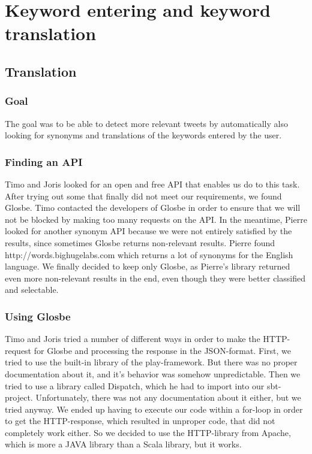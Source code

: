 \section{Keyword entering and keyword translation }
\subsection{Translation}
\label{sec:translation}
\subsubsection{Goal}
The goal was to be able to detect more relevant tweets by automatically also looking for synonyms and translations of the keywords entered by the user.

\subsubsection{Finding an API}

Timo and Joris looked for an open and free API that enables us do to this task. After trying out some that finally did not meet our requirements, we found Glosbe. Timo contacted the developers of Glosbe in order to ensure that we will not be blocked by making too many requests on the API. In the meantime, Pierre looked for another synonym API because we were not entirely satisfied by the results, since sometimes Glosbe returns non-relevant results. Pierre found http://words.bighugelabs.com which returns a lot of synonyms for the English language. We finally decided to keep only Glosbe, as Pierre's library returned even more non-relevant results in the end, even though they were better classified and selectable.

\subsubsection{Using Glosbe}

Timo and Joris tried a number of different ways in order to make the HTTP-request for Glosbe and processing the response in the JSON-format. First, we tried to use the built-in library of the play-framework. But there was no proper documentation about it, and it's behavior was somehow unpredictable. Then we tried to use a library called Dispatch, which he had to import into our sbt-project. Unfortunately, there was not any documentation about it either, but we tried anyway. We ended up having to execute our code within a for-loop in order to get the HTTP-response, which resulted in unproper code, that did not completely work either. So we decided to use the HTTP-library from Apache, which is more a JAVA library than a Scala library, but it works.

